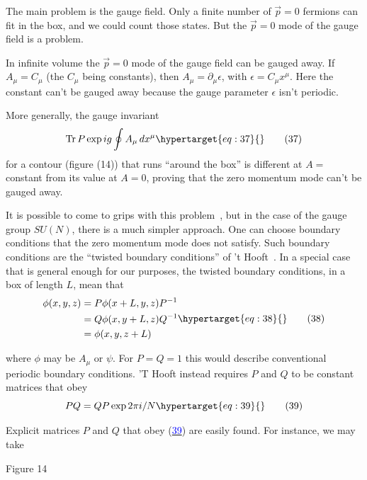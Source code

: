 \documentclass[11pt,a4paper]{article}
\newcommand{\eqtarget}[1]{\hypertarget{eq:#1}{\mathstrut}\tag{#1}}
\newcommand{\eqnref}[1]{(\hyperlink{eq:#1}{\textcolor{blue}{#1}})}
\begin{document}
The main problem is the gauge field. Only a finite number of
$\vec p = 0$ fermions can fit in the box, and we could count those states.
But the $\vec p = 0$ mode of the gauge field is a problem.

In infinite volume the $\vec p = 0$ mode of the gauge field can be gauged
away. If $A_\mu = C_\mu$ (the $C_\mu$ being constants), then $A_\mu = \partial_\mu \epsilon$, with
$\epsilon = C_\mu x^\mu$. Here the constant can't be gauged away because the gauge
parameter $\epsilon$ isn't periodic.

More generally, the gauge invariant
\begin{equation}
\operatorname{Tr} P \exp i g \oint A_\mu\, dx^\mu
\eqtarget{37}
\end{equation}
for a contour (figure (14)) that runs ``around the box'' is different
at $A =$ constant from its value at $A = 0$, proving that the zero
momentum mode can't be gauged away.

It is possible to come to grips with this problem~\cite{ref12}, but in the
case of the gauge group $SU(N)$, there is a much simpler approach.
One can choose boundary conditions that the zero momentum mode does
not satisfy. Such boundary conditions are the ``twisted boundary
conditions'' of 't Hooft~\cite{ref13}. In a special case that is general enough
for our purposes, the twisted boundary conditions, in a box of length
$L$, mean that
\begin{equation}
\begin{aligned}
\phi(x,y,z) &= P \phi(x+L,y,z) P^{-1} \\
&= Q \phi(x,y+L,z) Q^{-1} \\
&= \phi(x,y,z+L)
\end{aligned}
\eqtarget{38}
\end{equation}
\noindent
\begin{minipage}[t]{0.58\textwidth}
where $\phi$ may be $A_\mu$ or $\psi$. For
$P = Q = 1$ this would describe conventional periodic boundary
conditions. 'T Hooft instead requires
$P$ and $Q$ to be constant matrices
that obey
\begin{equation}
PQ = QP \exp 2\pi i/N
\eqtarget{39}
\end{equation}

Explicit matrices $P$ and $Q$ that
obey \eqnref{39} are easily found. For
instance, we may take
\end{minipage}\hfill
\begin{minipage}[t]{0.32\textwidth}
\vspace{0pt}
\centering

\par\smallskip
Figure 14
\end{minipage}
\end{document}
